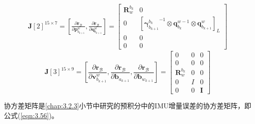 \begin{equation}
\label{eqn:4.12}
\begin{aligned}
\mathbf{J}[2]^{15 \times 7} = \left[\frac{\partial \mathbf{r}_{\mathcal{B}}}{\partial \mathbf{p}_{b_{k+1}}^{w}}, \frac{\partial \mathbf{r}_{\mathcal{B}}}{\partial \mathbf{q}_{b_{k+1}}^{w}}\right] 
= \left[ \begin{array}{cc}
\mathbf{R}_{w}^{b_k} & {0} \\ 
{0} & \left[{\bm{\gamma}_{b_{k+1}}^{b_{k}}}^{-1} \otimes \mathbf{q}_{b_{k}}^{w-1} \otimes \mathbf{q}_{b_{k+1}}^{w}\right]_L \\ 
{0} & {0}  \\ 
{0} & {0} 
\end{array}\right]
\end{aligned}
\end{equation}
\begin{equation}
\label{eqn:4.13}
\mathbf{J}[3]^{15 \times 9}=\left[\frac{\partial \mathbf{r}_{\mathcal{B}}}{\partial \mathbf{v}_{b_{k+1}}^{w}}, \frac{\partial \mathbf{r}_{\mathcal{B}}}{\partial \mathbf{b}_{a_{k+1}}}, \frac{\partial \mathbf{r}_{\mathcal{B}}}{\partial \mathbf{b}_{w_{k+1}}}\right]
=\left[ \begin{array}{ccc}{0} & {0} & {0} \\ {0} & {0} & {0} \\ {\mathbf{R}_{w}^{b_{k}}} & {0} & {0} \\ {0} & {I} & {0} \\ {0} & {0} & {\mathbf{I}}\end{array}\right]
\end{equation}

协方差矩阵是\ref{chap:3.2.3}小节中研究的预积分中的IMU增量误差的协方差矩阵，即公式(\ref{eqn:3.56})。
